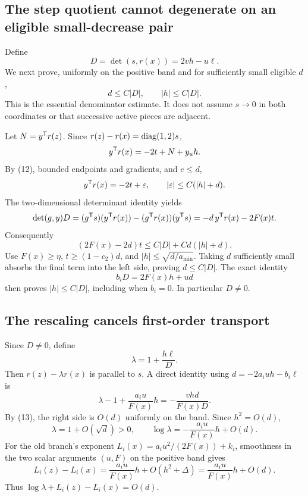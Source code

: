 \subsection{The step quotient cannot degenerate on an eligible small-decrease pair}
Define
\[
 D=\det(s,r(x))=2vh-u\ell.
\]
We next prove, uniformly on the positive band and for sufficiently small eligible $d$,
\begin{equation}
 d\le C|D|,\qquad |h|\le C|D|. \tag{Q.13}
\end{equation}
This is the essential denominator estimate. It does not assume $s\to0$ in both coordinates or that successive active pieces are adjacent.

Let $N=y^{\mathsf T} r(z)$. Since $r(z)-r(x)=\operatorname{diag}(1,2)s$,
\[
 y^{\mathsf T} r(x)=-2t+N+y_u h.
\]
By (12), bounded endpoints and gradients, and $e\le d$,
\[
 y^{\mathsf T} r(x)=-2t+\varepsilon,\qquad |\varepsilon|\le C(|h|+d).
\]
The two-dimensional determinant identity yields
\[
 \det(g,y)D=(g^{\mathsf T} s)(y^{\mathsf T} r(x))-(g^{\mathsf T} r(x))(y^{\mathsf T} s)
 =-d\,y^{\mathsf T} r(x)-2F(x)t.
\]
Consequently
\[
 (2F(x)-2d)t\le C|D|+Cd(|h|+d).
\]
Use $F(x)\ge\eta$, $t\ge(1-c_2)d$, and $|h|\le\sqrt{d/a_{\min}}$. Taking $d$ sufficiently small absorbs the final term into the left side, proving $d\le C|D|$. The exact identity
\begin{equation}
 b_iD=2F(x)h+ud \tag{Q.14}
\end{equation}
then proves $|h|\le C|D|$, including when $b_i=0$. In particular $D\ne0$.

\subsection{The rescaling cancels first-order transport}
Since $D\ne0$, define
\[
 \lambda=1+\frac{h\ell}{D}.
\]
Then $r(z)-\lambda r(x)$ is parallel to $s$. A direct identity using $d=-2a_iuh-b_i\ell$ is
\begin{equation}
 \lambda-1+\frac{a_i u}{F(x)}h
 =-\frac{vhd}{F(x)D}. \tag{Q.15}
\end{equation}
By (13), the right side is $O(d)$ uniformly on the band. Since $h^2=O(d)$,
\[
 \lambda=1+O(\sqrt d)>0,\qquad
 \log\lambda=-\frac{a_i u}{F(x)}h+O(d).
\]
For the old branch's exponent $L_i(x)=a_i u^2/(2F(x))+k_i$, smoothness in the two scalar arguments $(u,F)$ on the positive band gives
\[
 L_i(z)-L_i(x)=\frac{a_i u}{F(x)}h+O(h^2+\Delta)
 =\frac{a_i u}{F(x)}h+O(d).
\]
Thus $\log\lambda+L_i(z)-L_i(x)=O(d)$.

